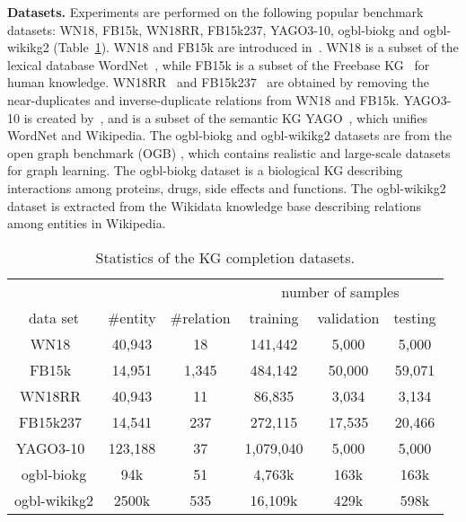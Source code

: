 \documentclass[10pt,journal,compsoc]{IEEEtran}
\newcommand{\parabegin}[1]{\vspace{3px}\noindent\textbf{#1}}
\begin{document}
\parabegin{Datasets.}
Experiments are performed on
the following popular benchmark 
datasets:
WN18, FB15k, WN18RR, FB15k237, YAGO3-10,
ogbl-biokg and ogbl-wikikg2
(Table~\ref{tab:dataset}).
WN18 and
FB15k 
are introduced in~\cite{bordes2013translating}.
WN18 is
a subset of the lexical database WordNet~\cite{miller1995wordnet},
while FB15k is
a subset of the Freebase KG~\cite{bollacker2008freebase} for human knowledge.
WN18RR~\cite{dettmers2017convolutional} and FB15k237~\cite{toutanova2015observed}
are obtained
by removing the near-duplicates and inverse-duplicate relations
from
WN18 and FB15k.
YAGO3-10 is
created by~\cite{dettmers2017convolutional}, and
is a subset of 
the semantic KG
YAGO~\cite{suchanek2007yago},
which
unifies WordNet and Wikipedia. 
The
ogbl-biokg and ogbl-wikikg2 datasets are from
the open graph benchmark (OGB) \cite{hu2020open}, which
contains
realistic and large-scale datasets for graph learning.
The ogbl-biokg dataset is a biological KG
describing interactions among proteins, drugs, side effects and functions.
The ogbl-wikikg2 dataset is extracted from the Wikidata knowledge base \cite{vrandevcic2014wikidata}
describing relations among entities in Wikipedia.


\begin{table}[ht]
	\centering
	\vspace{-7px}
	\caption{Statistics of the KG completion datasets.}
	\vspace{-10px}
	\label{tab:dataset}
	\setlength\tabcolsep{4pt}
	\begin{tabular}{c|ccccc}
		\toprule
		& & &  \multicolumn{3}{c}{number of samples}\\ 
		data set                 & \#entity & \#relation &  training & validation &
		testing  \\ \midrule
		WN18~\cite{bordes2013translating}     &  40,943  &     18     &  141,442  &  5,000  & 5,000    \\
		FB15k~\cite{bordes2013translating}    &  14,951  &   1,345    &  484,142  & 50,000  & 59,071 \\
		WN18RR~\cite{dettmers2017convolutional} &  40,943  &     11     &  86,835   &  3,034  & 3,134   \\
		FB15k237~\cite{toutanova2015observed}   &  14,541  &    237     &  272,115  & 17,535  & 20,466  \\
		YAGO3-10~\cite{mahdisoltani2013yago3}   & 123,188  &     37     & 1,079,040 &  5,000  & 5,000    \\ 
		\hline
		ogbl-biokg & 94k & 51 & 4,763k  & 163k  & 163k \\
		ogbl-wikikg2 & 2500k  & 535  & 16,109k &  429k  & 598k \\ 
		\bottomrule	
	\end{tabular}
\vspace{-7px}
\end{table}
\end{document}
